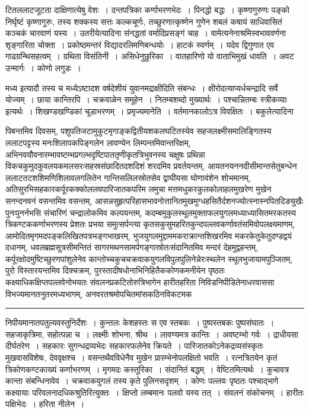\documentclass[11pt, openany]{book}
\begin{document}
\noindent
{\s टितललाटजूटता दाक्षिणात्येषु वेशः~। दन्तपत्रिका कर्णाभरणभेदः~। पिनद्धो बद्धः~। कृष्णागुरुणः पङ्को निर्घृष्टं कृष्णागुरुः, तस्य शक्कस्य सत्तः कल्कचूर्णः, तच्छुरणात्कृष्णेन गुणेन शबलं कषायं साधिवासितं कञ्चकं चारवाणं यस्य~। उतरीयेत्यादिना संनद्धतां वर्मादिप्रसङ्गं चाह~। वामेत्यनेनाश्रमिस्वभाववर्णना शृङ्गारिता चोक्ता~। {\qt प्रकोष्ठमन्तरं विद्यादरलिमणिबन्धयोः}~। हाटकं स्वर्णम्~। यदेव द्विगुणात एव गाढग्रन्थिसहत्वम्~। ग्रथिता विसंतिनी~। असिधेनुछुरिका~। वातहारिणो यो वाताभिमुखं धावति~। अवट उन्मार्गः~। कोणो लगुडः~।

मध्य इत्यादौ तस्य च मध्येऽष्टादश वर्षदेशीयं युवानमद्राक्षीदिति संबन्धः~। क्षीरोदत्याप्यर्धचन्द्रादि सर्वे योज्यम्~। छाया कान्तिरपि~। चक्रवाळेन समूहेन~। नितम्बशब्दो मुख्यार्थः~। {\qt पश्चान्नितम्बः स्त्रीकव्याः} इत्यर्थः~। शिखण्डखण्डिकां चूडाभरणम्~। {\qtt प्रमृज्यमानेति}~। वर्तमानकालोऽत्र विवक्षितः~। बकुलेत्यादिना}


\newpage
\lfoot{}

\noindent
पिबन्तमिव दिवसम्, पशुपतिजटामुकुटमृगाङ्कद्वितीयशकलघटितस्येव सहजलक्ष्मीसमालिङ्गितस्य ललाटपट्टस्य मनःशिलापकपिङ्गलेन लावण्येन लिम्पन्तमिवान्तरिक्षम्, अभिनवयौवनारम्भावष्टम्भप्रगल्भदृष्टिपाततृणीकृतत्रिभुवनस्य चक्षुषः प्रथिन्ना विकचकुमुदकुवलयकमलसरःसहस्रसंछादितदशदिशं शरदमिव प्रवर्तयन्तम्, आयतनयननदीसीमान्तसेतुबन्धेन ललाटतटशशिमणिशिलावलगलितेन गान्तिसलिलस्रोतसेव द्वाघीयसा घोणावंशेन शोभमानम्, अतिसुरभिसहकारकर्पूरकक्कोललवपारिजातकपरिम लमुचा मत्तमधुकरकुलकोलाहलमुखरेण मुखेन सनन्दनवनं वसन्तमिव वसन्तम्, आसन्नसुहृत्परिहासभावनोत्तानितमुखमुग्धहसितैर्दशनज्योत्स्नास्नपितदिङ्युखैः पुनःपुनर्नभसि संचारिणं चन्द्रालोकमिव कल्पयन्तम्, कदम्बमुकुलस्थूलमुक्ताफलयुगलमध्याध्यासितमरकतस्य त्रिकण्टककर्णाभरणस्य प्रेशतः प्रभया समुत्सर्पन्त्या कृतसकुसुमहरितकुन्दपल्लवकर्णावतंसमिवोपलक्ष्यमाणम्, आमोदितमृगमदपङ्कलिखितपत्रभङ्गभाखरम्, भुजयुगलमुद्दाममकराक्रान्तशिखरमिव मकरकेतुकेतुदण्डद्वयं दधानम्, धवलब्रह्मसूत्रसीमन्तितं सागरमथनसामर्पगङ्गास्रोतःसंदानितमिव मन्दरं देहमुद्वहन्तम्, कर्पूरक्षोदमुष्टिच्छुरणपांशुलेनेव कान्तोच्चकुचचक्रवाकयुगलविपुलपुलिनेन्नेरःस्थलेन स्थूलभुजायामपुञ्जितम्, पुरो विस्तारयन्तमिव दिक्चक्रम्, पुरस्तादीषधोनाभिनिहितैककोणकमनीयेन पृष्ठतः कक्ष्याधिकक्षिप्तपल्लवेनोभयतः संवलनप्रकटितोरुत्रिभागेन हारीतहरिता निविडनिपीडितेनाधरवाससा विभज्यमानतनुतरमध्यभागम्, अनवरतश्रमोपचितमांसकठिनविकटमक\textendash

\vspace{2mm}
\hrule

\noindent
{\s निपीयमानातपतुल्यवस्तुनिर्देशः~। कुन्तलः केशहस्तः स एव स्तबकः~। पुष्पस्तबकः पुष्पसंघातः~। सहजाकृत्रिमा, सहोत्पन्ना च~। लक्ष्मीः शोभना, श्रीथ~। लावण्यमत्र कान्तिः~। अवष्टम्भो गर्वः~। द्राधीयसा दीर्घतरेण~। सहकारः सुगन्धद्रव्यभेदः सहकारफलेनेव क्रियते~। पारिजातकोऽनेकद्रव्यसंस्कृतः मुखवासविशेषः, देववृक्षश्च~। वसन्तथैवविधेनैव मुखेन प्रारम्भेनोपलक्षितो भवति~। रत्नत्रितयेन कृतं त्रिकोणकण्टकाख्यं कर्णाभरणम्~। मृगमदः कस्तूरिका~। संदानितं बद्धम्~। वेष्टितमित्यर्थः~। कुचावत्र कान्ता संबन्धिनावेव~। चक्रवाकयुगलं तस्य कृते पुलिनसदृशम्~। कोणः पल्लवः पृष्ठतः पश्चाद्भागे कक्ष्यायाः परिवलनादधिकश्रुतिरित्युक्तः~। क्षिप्तो लम्बमानः पलवो यस्य तत्~। संवलनं संकोचनम्~। हारीतः पक्षिभेदः~। हरिता नीलेन~।}
\end{document}

